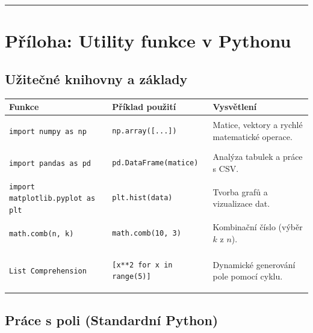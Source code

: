 \documentclass[a4paper, 11pt]{article}
\newenvironment{funkcedict}
{%
  \begingroup
  \renewcommand{\arraystretch}{1.4}%
  \lstset{basicstyle=\ttfamily\small, columns=fullflexible}%
  \setlength{\tabcolsep}{4pt}%
  \begin{tabular}{p{0.19\textwidth} p{0.38\textwidth} p{0.30\textwidth}}
  \textbf{Funkce} & \textbf{Příklad použití} & \textbf{Vysvětlení} \\
  \midrule
}
{%
  \end{tabular}%
  \endgroup
}
\begin{document}
\noindent\hrule\medskip

\clearpage
\section{Příloha: Utility funkce v Pythonu}

\subsection{Užitečné knihovny a základy}

\begin{funkcedict}
	\texttt{import numpy as np} &
	\begin{lstlisting}
np.array([...])
	\end{lstlisting}
	& Matice, vektory a rychlé matematické operace. \\
	\texttt{import pandas as pd} &
	\begin{lstlisting}
pd.DataFrame(matice)
	\end{lstlisting}
	& Analýza tabulek a práce s CSV. \\
	\texttt{import matplotlib.pyplot as plt} &
	\begin{lstlisting}
plt.hist(data)
	\end{lstlisting}
	& Tvorba grafů a vizualizace dat. \\
	\texttt{math.comb(n, k)} &
	\begin{lstlisting}
math.comb(10, 3)
	\end{lstlisting}
	& Kombinační číslo (výběr $k$ z $n$). \\
	\texttt{List Comprehension} &
	\begin{lstlisting}
[x**2 for x in range(5)]
	\end{lstlisting}
	& Dynamické generování pole pomocí cyklu. \\
\end{funkcedict}

\subsection{Práce s poli (Standardní Python)}
\end{document}
